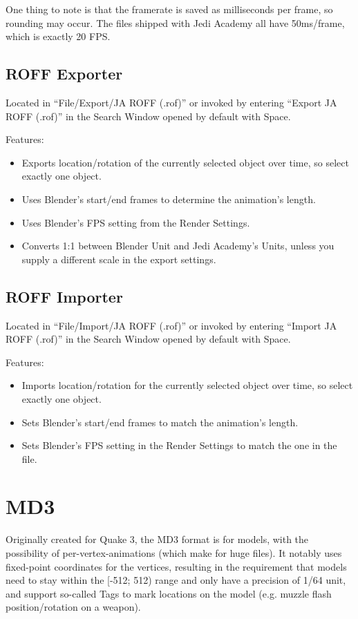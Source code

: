 \documentclass[a4paper,10pt]{article}
\begin{document}
 One thing to note is that the framerate is saved as milliseconds per frame, so rounding may occur. The
 files shipped with Jedi Academy all have 50ms/frame, which is exactly 20 FPS.
 
 \subsection{ROFF Exporter}
 
 Located in ``File/Export/JA ROFF (.rof)'' or invoked by entering ``Export JA ROFF (.rof)'' in the Search Window
 opened by default with Space.
 
 Features:
 \begin{itemize}
  \item Exports location/rotation of the currently selected object over time, so select exactly one object.
  \item Uses Blender's start/end frames to determine the animation's length.
  \item Uses Blender's FPS setting from the Render Settings.
  \item Converts 1:1 between Blender Unit and Jedi Academy's Units, unless you supply a different scale in
  the export settings.
 \end{itemize}

 \subsection{ROFF Importer}
 
 Located in ``File/Import/JA ROFF (.rof)'' or invoked by entering ``Import JA ROFF (.rof)'' in the Search Window
 opened by default with Space.
 
 Features:
 \begin{itemize}
  \item Imports location/rotation for the currently selected object over time, so select exactly one object.
  \item Sets Blender's start/end frames to match the animation's length.
  \item Sets Blender's FPS setting in the Render Settings to match the one in the file.
 \end{itemize}
 
 \section{MD3}
 
 Originally created for Quake 3, the MD3 format is for models, with the possibility of per-vertex-animations
 (which make for huge files). It notably uses fixed-point coordinates for the vertices, resulting in the
 requirement that models need to stay within the [-512; 512) range and only have a precision of 1/64 unit,
 and support so-called Tags to mark locations on the model (e.g. muzzle flash position/rotation on a weapon).
 
\end{document}
